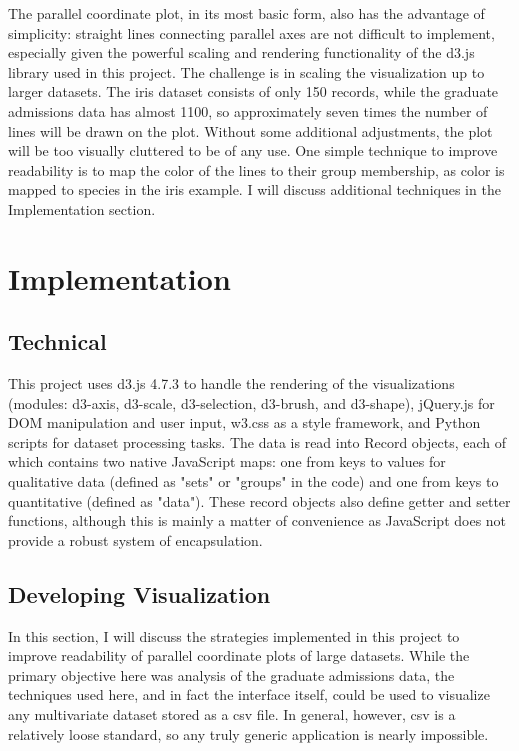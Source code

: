 \documentclass[]{article}
\begin{document}
	\par The parallel coordinate plot, in its most basic form, also has the advantage of simplicity: straight lines connecting parallel axes are not difficult to implement, especially given the powerful scaling and rendering functionality of the d3.js library\cite{d3} used in this project. The challenge is in scaling the visualization up to larger datasets. The iris dataset consists of only 150 records, while the graduate admissions data has almost 1100, so approximately seven times the number of lines will be drawn on the plot. Without some additional adjustments, the plot will be too visually cluttered to be of any use. One simple technique to improve readability is to map the color of the lines to their group membership, as color is mapped to species in the iris example. I will discuss additional techniques in the Implementation section.
	
\section{Implementation}
	\subsection{Technical}
	This project uses d3.js 4.7.3 to handle the rendering of the visualizations (modules: d3-axis, d3-scale, d3-selection, d3-brush, and d3-shape), jQuery.js for DOM manipulation and user input, w3.css as a style framework, and Python scripts for dataset processing tasks. The data is read into Record objects, each of which contains two native JavaScript maps: one from keys to values for qualitative data (defined as "sets" or "groups" in the code) and one from keys to quantitative (defined as "data"). These record objects also define getter and setter functions, although this is mainly a matter of convenience as JavaScript does not provide a robust system of encapsulation.

	\subsection{Developing Visualization}
		\par In this section, I will discuss the strategies implemented in this project to improve readability of parallel coordinate plots of large datasets. While the primary objective here was analysis of the graduate admissions data, the techniques used here, and in fact the interface itself, could be used to visualize any multivariate dataset stored as a csv file. In general, however, csv is a relatively loose standard\cite{csv}, so any truly generic application is nearly impossible.
\end{document}
